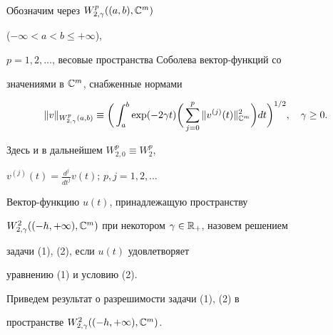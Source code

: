  


Обозначим через $W^{p}_{2,\gamma}((a,b),\Bbb C^m)$ 


($-\infty<a<b\le+\infty$), 


$p=1,2,\dotsc$, весовые пространства Соболева вектор-функций со 


значениями в $\Bbb C^m$, снабженные нормами 


$$ 


\|v\|_{W^{p}_{2,\gamma}(a,b)}\equiv\bigg(\int^b_a\exp(-2\gamma t) 


\bigg(\sum^p_{j=0}\|v^{(j)}(t)\|^2_{\Bbb C^m}\bigg)dt 


\bigg)^{1/2},\quad \gamma\ge0. 


$$ 


Здесь и в дальнейшем $W^p_{2,0}\equiv W^p_2$, 


$v^{(j)}(t)=\frac{d^j}{d t^j}v(t)$; $p,j=1,2,\dotsc$ 


 


\begin{defn} 


Вектор-функцию $u(t)$, принадлежащую пространству 


$W^{2}_{2,\gamma}((-h,+\infty),\Bbb C^m)$ при некотором $\gamma\in\Bbb 


R_+$, назовем решением 


задачи (1), (2), если $u(t)$ удовлетворяет 


уравнению (1) и условию (2). 


\end{defn} 


 


Приведем результат о разрешимости задачи (1), (2) в 


пространстве $W^{2}_{2,\gamma}((-h,+\infty),\Bbb C^m)$. 


 


